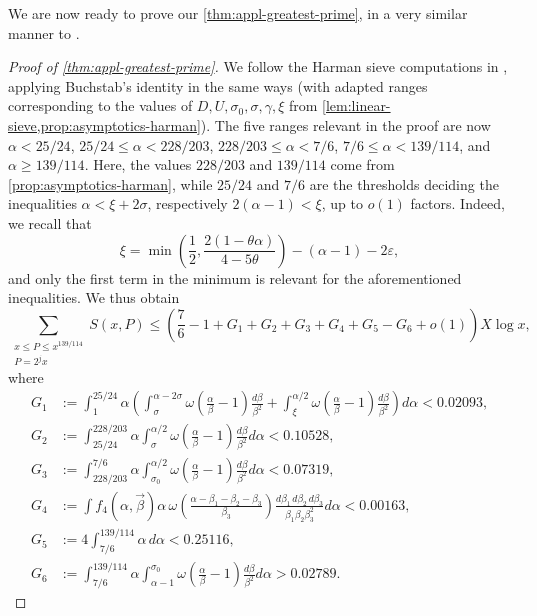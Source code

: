 \documentclass[reqno,11pt]{amsart}
\theoremstyle{remark}
\numberwithin{equation}{section}
\newcommand{\eps}{\varepsilon}
\begin{document}
We are now ready to prove our \cref{thm:appl-greatest-prime}, in a very similar manner to \cite[\S 2.6]{merikoski2023largest}.

\begin{proof}[Proof of \cref{thm:appl-greatest-prime}]
We follow the Harman sieve computations in \cite[\S 2.4]{merikoski2023largest}, applying Buchstab's identity in the same ways (with adapted ranges corresponding to the values of $D, U, \sigma_0, \sigma, \gamma, \xi$ from \cref{lem:linear-sieve,prop:asymptotics-harman}). The five ranges relevant in the proof are now $\alpha < 25/24$, $25/24 \le \alpha < 228/203$, $228/203 \le \alpha < 7/6$, $7/6 \le \alpha < 139/114$, and $\alpha \ge 139/114$. Here, the values $228/203$ and $139/114$ come from \cref{prop:asymptotics-harman}, while $25/24$ and $7/6$ are the thresholds deciding the inequalities $\alpha < \xi + 2\sigma$, respectively $2(\alpha-1) < \xi$, up to $o(1)$ factors. Indeed, we recall that
\[
    \xi = \min\left(\frac{1}{2}, \frac{2(1-\theta \alpha)}{4-5\theta}\right) - (\alpha-1) - 2\eps,
\]
and only the first term in the minimum is relevant for the aforementioned inequalities. We thus obtain
\[
    \sum_{\substack{x \le P \le x^{139/114} \\ P = 2^j x}} S(x, P) \le \left(\frac{7}{6}-1 + G_1 + G_2 + G_3 + G_4 + G_5 - G_6 + o(1)\right) X \log x,
\]
where 
\[
\begin{aligned}
    G_1 &:= \int_1^{25/24} \alpha \left(\int_\sigma^{\alpha-2\sigma} \omega\left(\frac{\alpha}{\beta}-1\right) \frac{d\beta}{\beta^2}
    +
    \int_\xi^{\alpha/2} \omega\left(\frac{\alpha}{\beta}-1\right) \frac{d\beta}{\beta^2}\right) d\alpha < 0.02093,
    \\
    G_2 &:= \int_{25/24}^{228/203} \alpha \int_\sigma^{\alpha/2} \omega\left(\frac{\alpha}{\beta}-1\right) \frac{d\beta}{\beta^2} d\alpha < 0.10528,
    \\
    G_3 &:= \int_{228/203}^{7/6} \alpha \int_{\sigma_0}^{\alpha/2} \omega\left(\frac{\alpha}{\beta}-1\right) \frac{d\beta}{\beta^2} d\alpha < 0.07319,
    \\
    G_4 &:= \int f_4\left(\alpha, \vec{\beta}\right) \alpha\, \omega\left(\frac{\alpha-\beta_1-\beta_2-\beta_3}{\beta_3}\right) \frac{d\beta_1\, d\beta_2\, d\beta_3}{\beta_1 \beta_2 \beta_3^2} d\alpha < 0.00163,
    \\
    G_5 &:= 4 \int_{7/6}^{139/114} \alpha\, d\alpha < 0.25116,
    \\
    G_6 &:= \int_{7/6}^{139/114} \alpha \int_{\alpha-1}^{\sigma_0} \omega\left(\frac{\alpha}{\beta} - 1\right) \frac{d\beta}{\beta^2} d\alpha > 0.02789.

\end{aligned}\]
\end{proof}
\end{document}
